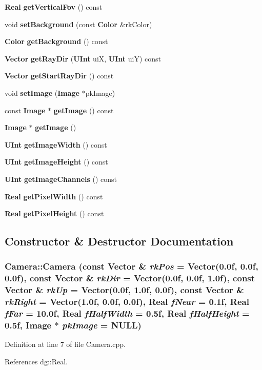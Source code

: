\begin{CompactItemize}
\item 
{\bf Real} {\bf get\-Vertical\-Fov} () const
\item 
void {\bf set\-Background} (const {\bf Color} \&rk\-Color)
\item 
{\bf Color} {\bf get\-Background} () const
\item 
{\bf Vector} {\bf get\-Ray\-Dir} ({\bf UInt} ui\-X, {\bf UInt} ui\-Y) const
\item 
{\bf Vector} {\bf get\-Start\-Ray\-Dir} () const
\item 
void {\bf set\-Image} ({\bf Image} $\ast$pk\-Image)
\item 
const {\bf Image} $\ast$ {\bf get\-Image} () const
\item 
{\bf Image} $\ast$ {\bf get\-Image} ()
\item 
{\bf UInt} {\bf get\-Image\-Width} () const
\item 
{\bf UInt} {\bf get\-Image\-Height} () const
\item 
{\bf UInt} {\bf get\-Image\-Channels} () const
\item 
{\bf Real} {\bf get\-Pixel\-Width} () const
\item 
{\bf Real} {\bf get\-Pixel\-Height} () const
\end{CompactItemize}


\subsection{Constructor \& Destructor Documentation}
\subsubsection{\setlength{\rightskip}{0pt plus 5cm}Camera::Camera (const {\bf Vector} \& {\em rk\-Pos} = {\bf Vector}(0.0f, 0.0f, 0.0f), const {\bf Vector} \& {\em rk\-Dir} = {\bf Vector}(0.0f, 0.0f, 1.0f), const {\bf Vector} \& {\em rk\-Up} = {\bf Vector}(0.0f, 1.0f, 0.0f), const {\bf Vector} \& {\em rk\-Right} = {\bf Vector}(1.0f, 0.0f, 0.0f), {\bf Real} {\em f\-Near} = 0.1f, {\bf Real} {\em f\-Far} = 10.0f, {\bf Real} {\em f\-Half\-Width} = 0.5f, {\bf Real} {\em f\-Half\-Height} = 0.5f, {\bf Image} $\ast$ {\em pk\-Image} = NULL)}\label{classdg_1_1Camera_a0}




Definition at line 7 of file Camera.cpp.

References dg::Real.
